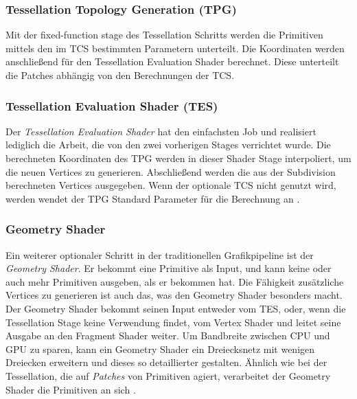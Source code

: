\subsubsection*{Tessellation Topology Generation (TPG)}
Mit der fixed-function stage des Tessellation Schritts werden die Primitiven mittels den im TCS bestimmten Parametern unterteilt.
Die Koordinaten werden anschließend für den Tessellation Evaluation Shader berechnet.
Diese unterteilt die Patches abhängig von den Berechnungen der TCS.

\subsubsection*{Tessellation Evaluation Shader (TES)}
Der \textit{Tessellation Evaluation Shader} hat den einfachsten Job und realisiert lediglich die Arbeit, die von den zwei vorherigen Stages verrichtet wurde.
Die berechneten Koordinaten des TPG werden in dieser Shader Stage interpoliert, um die neuen Vertices zu generieren.
Abschließend werden die aus der Subdivision berechneten Vertices ausgegeben. 
Wenn der optionale TCS nicht genutzt wird, werden wendet der TPG Standard Parameter für die Berechnung an \cite{cozzi2012opengl}\cite{Carvalho2022}.

\subsubsection{Geometry Shader}
\label{subsubsec:geometry_shader}
Ein weiterer optionaler Schritt in der traditionellen Grafikpipeline ist der \textit{Geometry Shader}.
Er bekommt eine Primitive als Input, und kann keine oder auch mehr Primitiven ausgeben, als er bekommen hat.
Die Fähigkeit zusätzliche Vertices zu generieren ist auch das, was den Geometry Shader besonders macht.
Der Geometry Shader bekommt seinen Input entweder vom TES, oder, wenn die Tessellation Stage keine Verwendung findet, vom Vertex Shader und leitet seine Ausgabe an den Fragment Shader weiter.
Um Bandbreite zwischen CPU und GPU zu sparen, kann ein Geometry Shader ein Dreiecksnetz mit wenigen Dreiecken erweitern und dieses so detaillierter gestalten.
Ähnlich wie bei der Tessellation, die auf \textit{Patches} von Primitiven agiert, verarbeitet der Geometry Shader die Primitiven an sich \cite{Chang2014}.

